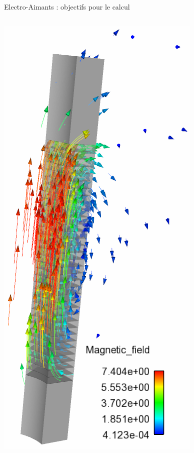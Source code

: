 \begin{frame}{Electro-Aimants : objectifs pour le calcul}
\begin{columns}[c]
    \includegraphics[height=.4\textheight]{Figures/cmi/HR-21-sector_magnetic_field_02.png}
  \end{columns}

\end{frame}

